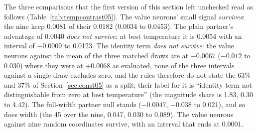\documentclass[11pt]{article}
\begin{document}
The three comparisons that the first version of this section left unchecked read
as follows (Table~\ref{tab:tempcontrast05}). The value neurons' small signal
\emph{survives}: the nine keep 0.0081 of their 0.0182 (0.0034 to 0.0453). The
plain partner's advantage of 0.0040 \emph{does not survive}: at best temperature
it is 0.0054 with an interval of $-0.0009$ to 0.0123. The identity term
\emph{does not survive}: the value neurons against the mean of the three matched
draws are at $-0.0067$ ($-0.012$ to 0.030) where they were at $+0.0068$ as
evaluated, none of the three intervals against a single draw excludes zero, and
the rules therefore do not state the 63\% and 37\% of Section~\ref{sec:const05}
as a split; their label for it is ``identity term not distinguishable from zero
at best temperature'' (the magnitude share is 1.83, 0.30 to 4.42). The full-width
partner null stands ($-0.0047$, $-0.038$ to 0.021), and so does width (the 45
over the nine, 0.047, 0.030 to 0.089). The value neurons against nine random
coordinates survive, with an interval that ends at 0.0001.
\end{document}
